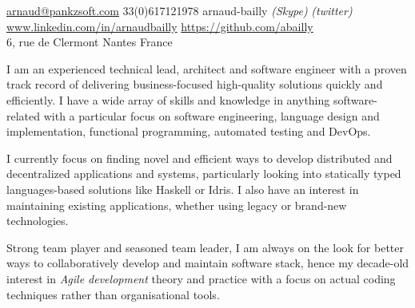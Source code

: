 \documentclass[12pt,a4paper]{article}
\begin{document}
\sloppy


\noindent\href{mailto:arnaud.at.pankzsoft.dot.com}{arnaud\mbox{}@\mbox{}pankzsoft.com}\sbull
\textsmaller{+}33(0)617121978\sbull
{\newnums arnaud-bailly} \emph{(Skype)} \emph{(twitter)}\sbull
\href{http://www.linkedin.com/in/arnaudbailly}{www.linkedin.com/in/arnaudbailly} \sbull
\href{https://github.com/abailly}{https://github.com/abailly} \\
6, rue de Clermont Nantes\sbull
France

\spacedhrule{0.9em}{-0.4em}  %


\begin{multicols}{2}  %
  I am an experienced technical lead, architect and software engineer with a proven track record of delivering business-focused high-quality solutions quickly and efficiently. I have a wide array of skills and knowledge in anything software-related with a particular focus on software engineering, language design and implementation, functional programming, automated testing and DevOps.

  I currently focus on finding novel and efficient ways to develop distributed and decentralized applications and systems, particularly looking into statically typed languages-based solutions like Haskell or Idris. I also have an interest in maintaining existing applications, whether using legacy or brand-new technologies.

  Strong team player and seasoned team leader, I am always on the look for better ways to collaboratively develop and maintain software stack, hence my decade-old interest in \emph{Agile development} theory and practice with a focus on actual coding techniques rather than organisational tools.
\end{multicols}

\end{document}
